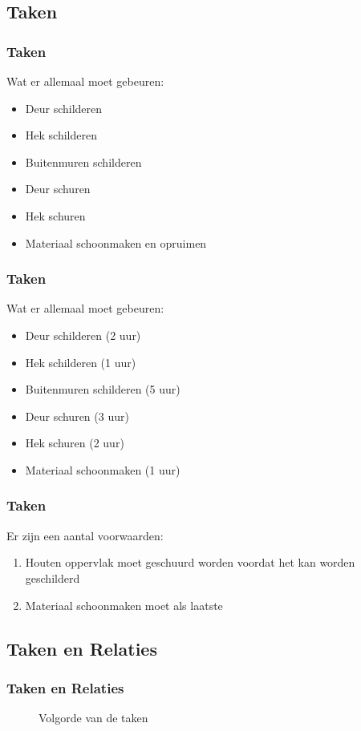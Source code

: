 \documentclass{beamer}
\theoremstyle{definition}
\newcommand{\inputtikz}[1]{}
\begin{document}
\subsection{Taken}
\begin{frame}
    \frametitle{Taken}
    Wat er allemaal moet gebeuren:
     \begin{itemize}
    	\item Deur schilderen
	\item Hek schilderen
	\item Buitenmuren schilderen
	\item<2-> Deur schuren
	\item<2-> Hek schuren
	\item<3-> Materiaal schoonmaken en opruimen
    \end{itemize}
\end{frame}

\begin{frame}
    \frametitle{Taken}
    Wat er allemaal moet gebeuren:
     \begin{itemize}
    	\item Deur schilderen (2 uur)
	\item Hek schilderen (1 uur)
	\item Buitenmuren schilderen (5 uur)
	\item Deur schuren (3 uur)
	\item Hek schuren (2 uur)
	\item Materiaal schoonmaken (1 uur)
    \end{itemize}
\end{frame}

\begin{frame}
    	\frametitle{Taken}
   	Er zijn een aantal voorwaarden:
	\begin{enumerate}
	    	\item Houten oppervlak moet geschuurd worden voordat het kan worden geschilderd
		\item Materiaal schoonmaken moet als laatste
	\end{enumerate}
\end{frame}

\subsection{Taken en Relaties}
\begin{frame}
	\frametitle{Taken en Relaties}
	\vspace{-1em}
	\begin{figure}[ht]
		\makebox[\textwidth][c]{\resizebox{.8\paperwidth}{!}{
			\inputtikz{precendence_graph}
		}}
		\vspace{-1em}
		\caption{Volgorde van de taken}
	\end{figure}
\end{frame}
\end{document}
